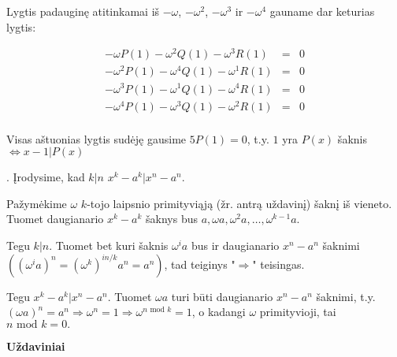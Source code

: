Lygtis padauginę atitinkamai iš $-\omega$, $-\omega^2$, $-\omega^3$ ir $-\omega^4$ gauname dar keturias lygtis:

\begin{eqnarray*}
-\omega P(1) - \omega^2 Q(1) - \omega^3 R(1) &=& 0 \\
-\omega^2 P(1) - \omega^4 Q(1) - \omega^1 R(1) &=& 0 \\
-\omega^3 P(1) - \omega^1 Q(1) - \omega^4 R(1) &=& 0 \\
-\omega^4 P(1) - \omega^3 Q(1) - \omega^2 R(1) &=& 0 \\
\end{eqnarray*} 

Visas aštuonias lygtis sudėję gausime $5P(1) = 0$, t.y. $1$ yra $P(x)$ šaknis $\Leftrightarrow x-1|P(x)$

. Įrodysime, kad $k|n$ \Leftrightarrow $x^k - a^k | x^n - a^n$.

\smallskip
Pažymėkime $\omega$ $k$-tojo laipsnio primityviąją (žr. antrą uždavinį) šaknį iš vieneto. Tuomet daugianario $x^k - a^k$ šaknys bus $a, \omega a, \omega^2 a, \dots, \omega^{k-1}a.$ 

Tegu $k|n$. Tuomet bet kuri šaknis $\omega^i a$ bus ir daugianario $x^n - a^n$ šaknimi $((\omega^i a)^n = (\omega^k)^{in/k} a^n = a^n)$, tad teiginys "$\Rightarrow$" teisingas.

Tegu $x^k - a^k | x^n - a^n.$ Tuomet $\omega a$ turi būti daugianario $x^n - a^n$ šaknimi, t.y. $(\omega a)^n = a^n \Rightarrow \omega^{n} = 1 \Rightarrow \omega^{n \text{ mod } k} = 1$, o kadangi $\omega$ primityvioji, tai $n \text{ mod } k = 0.$  

\bigskip

\begin{center}\textbf{Uždaviniai}\end{center}

